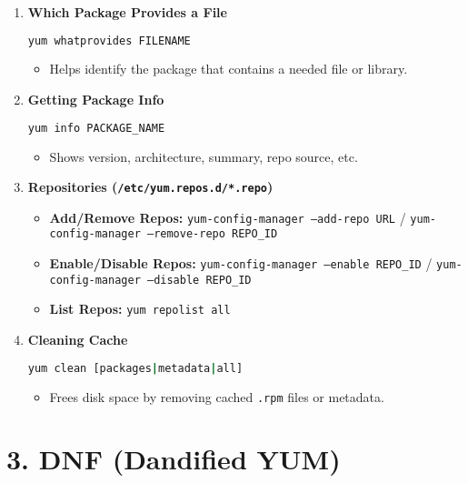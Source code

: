 \documentclass[a4paper]{report}
\begin{document}
\begin{enumerate}
    \item \textbf{Which Package Provides a File}
    \begin{lstlisting}[language=bash]
yum whatprovides FILENAME
    \end{lstlisting}
    \begin{itemize}
        \item Helps identify the package that contains a needed file or library.
    \end{itemize}

    \item \textbf{Getting Package Info}
    \begin{lstlisting}[language=bash]
yum info PACKAGE_NAME
    \end{lstlisting}
    \begin{itemize}
        \item Shows version, architecture, summary, repo source, etc.
    \end{itemize}

    \item \textbf{Repositories (\texttt{/etc/yum.repos.d/*.repo})}
    \begin{itemize}
        \item \textbf{Add/Remove Repos:} \texttt{yum-config-manager --add-repo URL} / \texttt{yum-config-manager --remove-repo REPO\_ID}
        \item \textbf{Enable/Disable Repos:} \texttt{yum-config-manager --enable REPO\_ID} / \texttt{yum-config-manager --disable REPO\_ID}
        \item \textbf{List Repos:} \texttt{yum repolist all}
    \end{itemize}

    \item \textbf{Cleaning Cache}
    \begin{lstlisting}[language=bash]
yum clean [packages|metadata|all]
    \end{lstlisting}
    \begin{itemize}
        \item Frees disk space by removing cached \texttt{.rpm} files or metadata.
    \end{itemize}
\end{enumerate}

\section*{3. DNF (Dandified YUM)}
\end{document}
